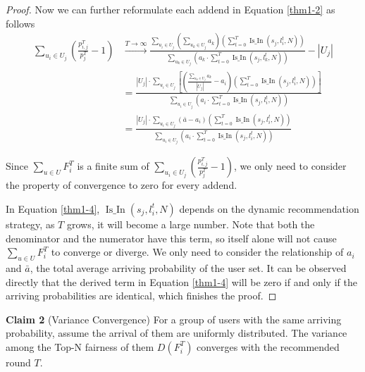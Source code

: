 \begin{proof}
Now we can further reformulate each addend in Equation \ref{thm1-2} as follows
\begin{equation}
    \begin{aligned}
        \sum_{u_{i} \in U_{j}}\left( \frac{p_{i, j}^{T}}{p_{j}^{T}}-1\right) 
        & \stackrel{{T\rightarrow \infty}}{\longrightarrow} \frac{\sum_{u_i \in U_j} \left(\sum_{u_k \in U_{j}} a_k\right) \left( \sum_{t=0}^{T} \operatorname{Is\_In}\left(s_{j}, l_{i}^{t}, N\right)\right)}{\sum_{u_{k} \in U_{j}} \left(a_{k} \cdot  \sum_{t=0}^{T}  \operatorname{Is\_In}\left(s_{j}, l_{k}^{t}, N\right)\right)} - \left| U_j \right| \\
        &= \frac{\left| U_j \right|\cdot \sum_{u_i \in U_j} \left[\left(\frac{\sum_{u_k \in U_{j}} a_k}{\left| U_j \right|}  - a_{i} \right) \left( \sum_{t=0}^{T} \operatorname{Is\_In}\left(s_{j}, l_{i}^{t}, N\right)\right) \right]}
        {\sum_{u_{i} \in U_{j}} \left(a_{i} \cdot  \sum_{t=0}^{T}  \operatorname{Is\_In}\left(s_{j}, l_{i}^{t}, N\right)\right)} \\
        &= \frac{\left| U_j \right|\cdot \sum_{u_i \in U_j} \left( \bar{a}- a_{i} \right) \left(\sum_{t=0}^{T} \operatorname{Is\_In}\left(s_{j}, l_{i}^{t}, N\right)\right) }
        {\sum_{u_{i} \in U_{j}} \left(a_{i} \cdot  \sum_{t=0}^{T}  \operatorname{Is\_In}\left(s_{j}, l_{i}^{t}, N\right)\right)} 
    \end{aligned}
    \label{thm1-4}
\end{equation}


Since $\sum_{u \in U} F_{i}^{T}$ is a finite sum of $\sum_{u_{i} \in U_{j}}\left( \frac{p_{i, j}^{T}}{p_{j}^{T}}-1\right)$, we only need to consider the property of convergence to zero for every addend.

In Equation \ref{thm1-4}, $\operatorname{Is\_In}\left(s_{j}, l_{i}^{t}, N\right)$ depends on the dynamic recommendation strategy, as $T$ grows, it will become a large number. Note that both the denominator and the numerator have this term, so itself alone will not cause $\sum_{u \in U} F_{i}^{T}$ to converge or diverge. We only need to consider the relationship of $a_i$ and $\bar{a}$, the total average arriving probability of the user set. It can be observed directly that the derived term in Equation \ref{thm1-4} will be zero if and only if the arriving probabilities are identical, which finishes the proof.
\end{proof}



\textbf{Claim 2} (Variance Convergence) For a group of users with the same arriving probability, assume the arrival of them are uniformly distributed. The variance among the Top-N fairness of them $D\left(F_{i}^{T}\right)$ converges with the recommended round $T$.

